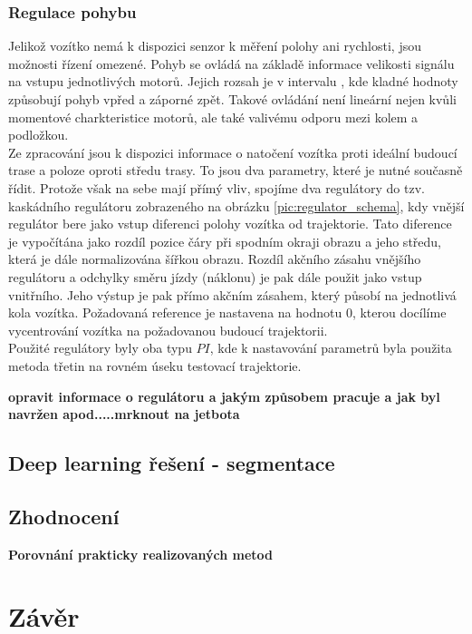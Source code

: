 \documentclass[czech, bc, kky, he, iso690numb]{fasthesis}
\begin{document}
            \subsection{Regulace pohybu}
                Jelikož vozítko nemá k dispozici senzor k měření polohy ani rychlosti, jsou možnosti řízení omezené. Pohyb se ovládá na základě informace velikosti signálu na vstupu jednotlivých motorů. Jejich rozsah je v intervalu \(<-1,1>\), kde kladné hodnoty způsobují pohyb vpřed a záporné zpět. Takové ovládání není lineární nejen kvůli momentové charkteristice motorů, ale také valivému odporu mezi kolem a podložkou.\\
                Ze zpracování jsou k dispozici informace o natočení vozítka proti ideální budoucí trase a poloze oproti středu trasy. To jsou dva parametry, které je nutné současně řídit. Protože však na sebe mají přímý vliv, spojíme dva regulátory do tzv. kaskádního regulátoru zobrazeného na obrázku \ref{pic:regulator_schema}, kdy vnější regulátor bere jako vstup diferenci polohy vozítka od trajektorie. Tato diference je vypočítána jako rozdíl pozice čáry při spodním okraji obrazu a jeho středu, která je dále normalizována šířkou obrazu.  Rozdíl akčního zásahu vnějšího regulátoru a odchylky směru jízdy (náklonu) je pak dále použit jako vstup vnitřního. Jeho výstup je pak přímo akčním zásahem, který působí na jednotlivá kola vozítka. Požadovaná reference je nastavena na hodnotu \(0\), kterou docílíme vycentrování vozítka na požadovanou budoucí trajektorii.\\
                Použité regulátory byly oba typu \(PI\), kde k nastavování parametrů byla použita metoda třetin na rovném úseku testovací trajektorie.
                 
                \textbf{opravit informace o regulátoru a jakým způsobem pracuje a jak byl navržen apod.....mrknout na jetbota}
        \section{Deep learning řešení - segmentace}
        \section{Zhodnocení}
        	\textbf{Porovnání prakticky realizovaných metod}
    \chapter{Závěr}
\end{document}
